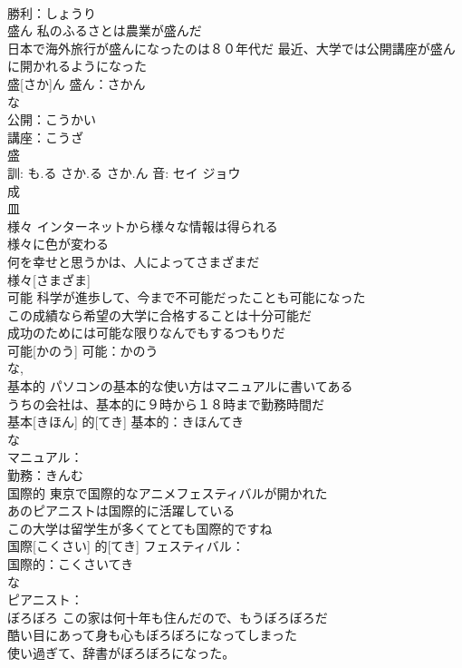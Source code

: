 \documentclass[8pt]{extreport}
\begin{document}
\begin{CJK}{UTF8}{min}
\\	勝利：しょうり
\\	盛ん	私のふるさとは農業が盛んだ 
\\	日本で海外旅行が盛んになったのは８０年代だ 最近、大学では公開講座が盛んに開かれるようになった 
\\	盛[さか]ん			盛ん：さかん
\\	な 
\\	公開：こうかい
\\	講座：こうざ
\\	盛 
\\	訓: も.る さか.る さか.ん 音: セイ ジョウ 
\\	成 
\\	皿 
\\	様々	インターネットから様々な情報は得られる 
\\	様々に色が変わる 
\\	何を幸せと思うかは、人によってさまざまだ 
\\	様々[さまざま]						
\\	可能	科学が進歩して、今まで不可能だったことも可能になった 
\\	この成績なら希望の大学に合格することは十分可能だ 
\\	成功のためには可能な限りなんでもするつもりだ 
\\	可能[かのう]			可能：かのう
\\	な, 
\\	基本的	パソコンの基本的な使い方はマニュアルに書いてある 
\\	うちの会社は、基本的に９時から１８時まで勤務時間だ 
\\	基本[きほん] 的[てき]			基本的：きほんてき
\\	な 
\\	マニュアル：
\\	勤務：きんむ
\\	国際的	東京で国際的なアニメフェスティバルが開かれた 
\\	あのピアニストは国際的に活躍している 
\\	この大学は留学生が多くてとても国際的ですね 
\\	国際[こくさい] 的[てき]			フェスティバル：
\\	国際的：こくさいてき
\\	な 
\\	ピアニスト：
\\	ぼろぼろ	この家は何十年も住んだので、もうぼろぼろだ 
\\	酷い目にあって身も心もぼろぼろになってしまった 
\\	使い過ぎて、辞書がぼろぼろになった。 

\end{CJK}
\end{document}
